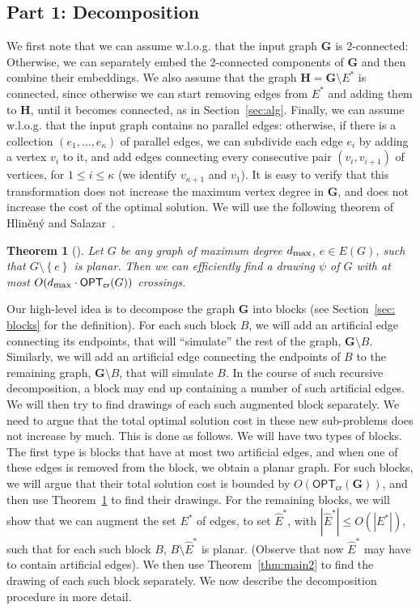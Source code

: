 \documentclass[twoside,leqno,twocolumn]{article}
\newcommand{\set}[1]{\left\{ #1 \right\}}
\newtheorem{theorem}{Theorem}
\newcommand{\optcro}[1]{\mathsf{OPT}_{\mathsf{cr}}(#1)}
\newcommand{\dmax}{d_{\mbox{\textup{\footnotesize{max}}}}}
\newcommand{\G}{{\mathbf{G}}}
\renewcommand{\H}{{\mathbf{H}}}
\begin{document}
\subsection{Part 1: Decomposition}
We first note that we can assume w.l.o.g. that the input graph $\G$ is $2$-connected:
Otherwise, we can separately embed the 2-connected components of $\G$ and then combine their embeddings.
We also assume that the graph $\H=\G\setminus E^*$ is connected, since otherwise we can start removing edges from $E^*$ and adding them to $\H$, until it becomes connected, as in Section~\ref{sec:alg}. Finally, we can assume w.l.o.g. that the input graph contains no parallel edges: otherwise, if there is a collection $(e_1,\ldots,e_{\kappa})$ of parallel edges, we can subdivide each edge $e_i$ by adding a vertex $v_i$ to it, and add edges connecting every consecutive pair $(v_i,v_{i+1})$ of vertices, for $1\leq i\leq \kappa$ (we identify $v_{\kappa+1}$ and $v_1$). It is easy to verify that this transformation does not increase the maximum vertex degree in $\G$, and does not increase the cost of the optimal solution.
We will use the following theorem of Hlin\v{e}n\'{y} and Salazar~\cite{HlinenyS06}.

\begin{theorem}[\cite{HlinenyS06}]\label{thm planar and edge}
Let $G$ be any graph of maximum degree $\dmax$, $e\in E(G)$, such that $G\setminus\set{e}$ is planar. Then we can efficiently find a drawing $\psi$ of $G$ with at most $O(\dmax\cdot \optcro{G})$ crossings.
\end{theorem}

Our high-level idea is to decompose the graph $\G$ into blocks (see Section~\ref{sec: blocks} for the definition). For each such block $B$, we will add an artificial edge connecting its endpoints, that will ``simulate'' the rest of the graph, $\G\setminus B$. Similarly, we will add an artificial edge connecting the endpoints of $B$ to the remaining graph, $\G\setminus B$, that will simulate $B$. In the course of such recursive decomposition, a block may end up containing a number of such artificial edges. We will then try to find drawings of each such augmented block separately. We need to argue that the total optimal solution cost in these new sub-problems does not increase by much. This is done as follows. We will have two types of blocks. The first type is blocks that have at most two artificial edges, and when one of these edges is removed from the block, we obtain a planar graph.  For such blocks, we will argue that their total solution cost is bounded by $O(\optcro{\G})$, and then use Theorem~\ref{thm planar and edge} to find their drawings. For the remaining blocks, we will show that we can augment the set $E^*$ of edges, to set $\hat{E}^*$, with $|\hat{E}^*|\leq O(|E^*|)$, such that for each such block $B$, $B\setminus \hat{E}^*$ is planar. (Observe that now $\hat{E}^*$ may have to contain artificial edges). We then use Theorem~\ref{thm:main2} to find the drawing of each such block separately. We now describe the decomposition procedure in more detail.
\end{document}
